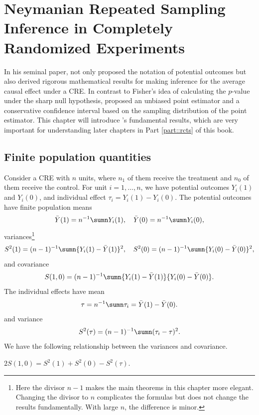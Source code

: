 
\chapter{Neymanian Repeated Sampling Inference in Completely Randomized Experiments}\label{chapter::neyman-cr}
 
 
In his seminal paper,  \citet{Neyman:1923} not only proposed the notation of potential outcomes but also derived rigorous mathematical results for making inference for the average causal effect under a CRE. In contrast to Fisher's idea of calculating the $p$-value under the sharp null hypothesis, \citet{Neyman:1923} proposed an unbiased point estimator and a conservative confidence interval based on the sampling distribution of the point estimator. This chapter will introduce \citet{Neyman:1923}'s fundamental results, which are very important for understanding later chapters in Part \ref{part::rcts} of this book.



\section{Finite population quantities}

Consider a CRE with $n$ units, where $n_1$ of them receive the treatment and $n_0$ of them receive the control. For unit $i = 1, \ldots, n$, we have potential outcomes $Y_i(1)$ and $Y_i(0)$, and individual effect $\tau_i = Y_i(1) - Y_i(0).$ The potential outcomes have finite population means  
$$
\bar{Y}(1) = n^{-1} \sumn Y_i(1),\quad
\bar{Y}(0) = n^{-1} \sumn Y_i(0),
$$
variances\footnote{Here the divisor $n-1$ makes the main theorems in this chapter more elegant. Changing the divisor to $n$ complicates the formulas but does not change the results fundamentally. With large $n$, the difference is minor.}
$$
S^2(1) = (n-1)^{-1} \sumn \{ Y_i(1) -\bar{Y}(1)  \}^2,\quad
S^2(0) = (n-1)^{-1} \sumn \{ Y_i(0) -\bar{Y}(0)  \}^2 ,
$$
and covariance
$$
S(1,0) = (n-1)^{-1} \sumn \{ Y_i(1) -\bar{Y}(1)  \}\{ Y_i(0) -\bar{Y}(0)  \} . 
$$
The individual effects have mean
$$
\tau = n^{-1} \sumn \tau_i = \bar{Y}(1) - \bar{Y}(0) .
$$
and variance
$$
S^2(\tau) = (n-1)^{-1} \sumn (\tau_i - \tau)^2.
$$
We have the following relationship between the variances and covariance.
\begin{lemma}\label{lemma::variancecovariancetau}
$2S(1,0) = S^2(1)+S^2(0) - S^2(\tau).$
\end{lemma}

